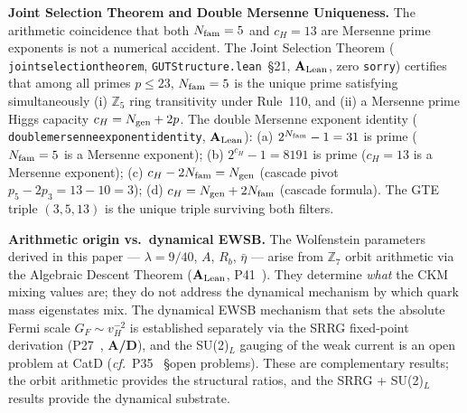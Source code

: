 \documentclass[11pt]{article}
\theoremstyle{remark}
\newcommand{\Ngen}{N_{\rm gen}}
\newcommand{\Nfam}{N_{\rm fam}}
\newcommand{\cH}{c_H}
\newcommand{\lean}[1]{%
  \penalty-100
  \begingroup\def\_{\textunderscore\allowbreak}\texttt{#1}\endgroup}
\newcommand{\lam}{\lambda}
\newcommand{\Ebar}{\bar{\eta}}
\newcommand{\Rb}{R_b}
\newcommand{\CatAL}{\ensuremath{\textbf{A}_{\rm Lean}}}
\newcommand{\CatAD}{\textbf{A/D}}
\begin{document}
\smallskip
\noindent\textbf{Joint Selection Theorem and Double Mersenne Uniqueness.}
The arithmetic coincidence that both $\Nfam = 5$ and $\cH = 13$ are Mersenne prime
exponents is not a numerical accident.
The Joint Selection Theorem (\lean{joint\_selection\_theorem},
\texttt{GUTStructure.lean}~\S21, $\CatAL$, zero \texttt{sorry})
certifies that among all primes $p \leq 23$, $\Nfam = 5$ is the unique prime satisfying
simultaneously (i) $\mathbb{Z}_5$ ring transitivity under Rule~110, and (ii) a Mersenne
prime Higgs capacity $\cH = \Ngen + 2p$.
The double Mersenne exponent identity (\lean{double\_mersenne\_exponent\_identity},
$\CatAL$): (a) $2^{\Nfam} - 1 = 31$ is prime ($\Nfam = 5$ is a Mersenne exponent);
(b) $2^{\cH} - 1 = 8191$ is prime ($\cH = 13$ is a Mersenne exponent);
(c) $\cH - 2\Nfam = \Ngen$ (cascade pivot $p_5 - 2p_3 = 13 - 10 = 3$);
(d) $\cH = \Ngen + 2\Nfam$ (cascade formula).
The GTE triple $(3, 5, 13)$ is the unique triple surviving both filters.

\medskip
\noindent\textbf{Arithmetic origin vs.\ dynamical EWSB.}\enspace
The Wolfenstein parameters derived in this paper --- $\lam = 9/40$, $A$, $\Rb$,
$\Ebar$ --- arise from $\mathbb{Z}_7$ orbit arithmetic via the Algebraic Descent
Theorem (\CatAL, P41~\cite{SpivackCMCA}).  They determine \emph{what} the CKM
mixing values are; they do not address the dynamical mechanism by which quark mass
eigenstates mix.  The dynamical EWSB mechanism that sets the absolute Fermi scale
$G_F \sim v_H^{-2}$ is established separately via the SRRG fixed-point derivation
(P27~\cite{SpivackSRRG}, \CatAD), and the SU(2)$_L$ gauging of the weak current
is an open problem at CatD (\textit{cf.}\ P35~\cite{SpivackGTEUnification} §open
problems).  These are complementary results; the orbit arithmetic provides the
structural ratios, and the SRRG + SU(2)$_L$ results provide the dynamical substrate.
\end{document}
